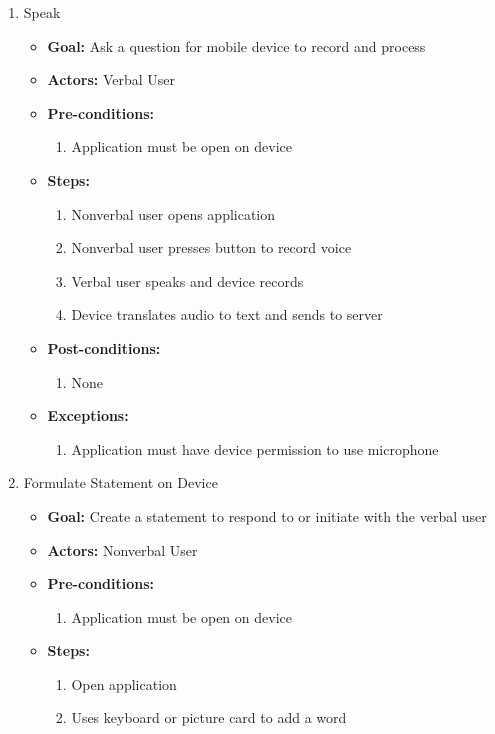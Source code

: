 \begin{enumerate}
	\item Speak
	\begin{itemize}
   		\item \textbf{Goal:} Ask a question for mobile device to record and process
		\item \textbf{Actors:} Verbal User
		\item \textbf{Pre-conditions:} 
		\begin{enumerate}
			\item Application must be open on device
		\end{enumerate}
		\item \textbf{Steps:}
		\begin{enumerate}
			\item Nonverbal user opens application
			\item Nonverbal user presses button to record voice
			\item Verbal user speaks and device records
			\item Device translates audio to text and sends to server
		\end{enumerate}
		\item \textbf{Post-conditions:}
		\begin{enumerate}
			\item None
		\end{enumerate}
		\item \textbf{Exceptions:}
		\begin{enumerate}
			\item Application must have device permission to use microphone
		\end{enumerate}
	\end{itemize}
	\item Formulate Statement on Device
	\begin{itemize}
   		\item \textbf{Goal:} Create a statement to respond to or initiate with the verbal user
		\item \textbf{Actors:} Nonverbal User
		\item \textbf{Pre-conditions:}
		\begin{enumerate}
			\item Application must be open on device
		\end{enumerate}
		\item \textbf{Steps:}
		\begin{enumerate}
			\item Open application
			\item Uses keyboard or picture card to add a word

\end{enumerate}
\end{itemize}
\end{enumerate}
